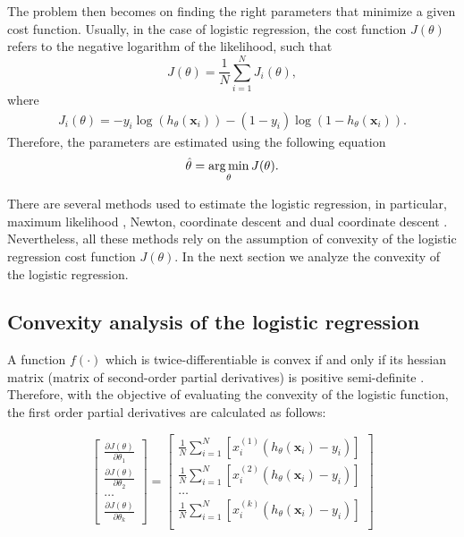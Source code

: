 The problem then becomes on finding the right parameters that minimize a given cost function.   
Usually, in the case of logistic regression, the cost function $J(\theta)$ refers to the negative   
logarithm of the likelihood, such that
\begin{equation}
  J(\theta)=\frac{1}{N}\sum_{i=1}^{N} J_i(\theta),
\end{equation}
where
\begin{align}\label{eq:7:lrcost}
  J_i(\theta) =  -y_i\log(h_\theta(\mathbf{x}_i)) -(1-y_i)\log(1-h_\theta(\mathbf{x}_i)).
\end{align}
Therefore, the parameters are estimated using the following equation
\begin{align}
  \hat \theta = \operatorname*{arg\,min}_\theta J(\theta).
\end{align}

There are several methods used to estimate the logistic regression, in particular, maximum 
likelihood \citep{Hastie2009}, Newton, coordinate descent \citep{Murphy2012} and dual coordinate 
descent \citep{Yu2011}. Nevertheless, all these methods rely on the assumption of convexity of the 
logistic regression cost function $J(\theta)$. In the next section we analyze the convexity of the 
logistic regression.


\subsection{Convexity analysis of the logistic regression}

A function $f(\cdot)$ which is twice-differentiable is convex if and only if its hessian 
matrix (matrix of second-order partial derivatives) is positive semi-definite \citep{Boyd2010}.
Therefore, with the objective of evaluating the convexity of the logistic function, the first 
order partial derivatives are calculated as follows:

\begin{equation}
\left[ \begin{array}{c}
  \frac{\partial J(\theta)}{\partial \theta_1} \\[0.1in]	
  \frac{\partial J(\theta)}{\partial \theta_2} \\[0.1in]	
  \ldots \\[0.1in]	
  \frac{\partial J(\theta)}{\partial \theta_k}
\end{array} \right] =
\left[ \begin{array}{c}
  \frac{1}{N}\sum_{i=1}^{N}\left[x_i^{(1)}\left(h_\theta(\mathbf{x}_i)-y_i\right)\right]\\[0.1in]
  \frac{1}{N}\sum_{i=1}^{N}\left[x_i^{(2)}\left(h_\theta(\mathbf{x}_i)-y_i\right)\right]\\[0.1in]
  \ldots \\[0.1in]	
  \frac{1}{N}\sum_{i=1}^{N}\left[x_i^{(k)}\left(h_\theta(\mathbf{x}_i)-y_i\right)\right]\\[0.1in]	
\end{array} \right]
\end{equation}

